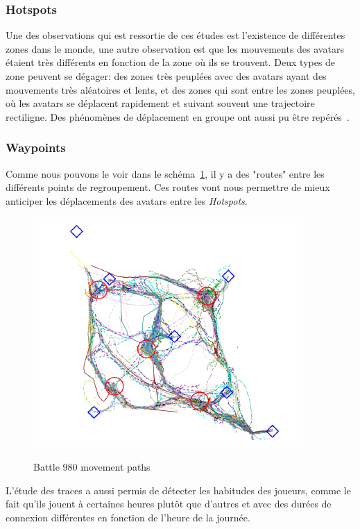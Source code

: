 		\subsubsection{Hotspots}
	Une des observations qui est ressortie de ces études est l'existence de différentes zones dans le monde, une autre observation est que les mouvements des avatars étaient très différents en fonction de la zone où ils se trouvent. Deux types de zone peuvent se dégager: des zones très peuplées avec des avatars ayant des mouvements très aléatoires et lents, et des zones qui sont entre les zones peuplées, où les avatars se déplacent rapidement et suivant souvent une trajectoire rectiligne. Des phénomènes de déplacement en groupe ont aussi pu être repérés~\cite{15141312}. \\
		\subsubsection{Waypoints}
	Comme nous pouvons le voir dans le schéma~\ref{sch_trace}, il y a des "routes" entre les différents points de regroupement. Ces routes vont nous permettre de mieux anticiper les déplacements des avatars entre les \textit{Hotspots}.
        \vspace{1mm}
        \begin{figure}[!h]
        \centering
        \includegraphics[scale=0.75]{./Ressources/Images/trace.png}\\
        \caption{Battle 980 movement paths}
        \label{sch_trace}
        \end{figure}	
        \vspace{1mm}
\newline
	L'étude des traces a aussi permis de détecter les habitudes des joueurs, comme le fait qu'ils jouent à certaines heures plutôt que d'autres et avec des durées de connexion différentes en fonction de l'heure de la journée.

